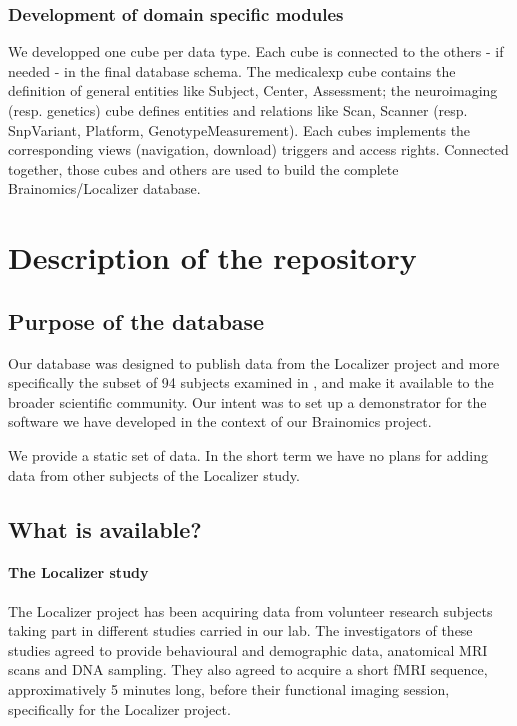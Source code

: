 \documentclass[review]{elsarticle}
\begin{document}
\subsubsection{Development of domain specific modules}

We developped one cube per data type. Each cube is connected to the others - if needed - in the final database schema. The medicalexp cube contains the definition of general entities like Subject, Center, Assessment; the neuroimaging (resp. genetics) cube defines entities and relations like Scan, Scanner (resp. SnpVariant, Platform, GenotypeMeasurement). Each cubes implements the corresponding views (navigation, download) triggers and access rights. Connected together, those cubes and others are used to build the complete Brainomics/Localizer database.


\section{Description of the repository}

\subsection{Purpose of the database}

Our database was designed to publish data from the Localizer project
\cite{Pinel2007} and more specifically the subset of 94 subjects examined
in \cite{Pinel2012}, and make it available to the broader
scientific community. Our intent was to set up a demonstrator for the
software we have developed in the context of our Brainomics project.

We provide a static set of data. In the short term we have no plans for
adding data from other subjects of the Localizer study.


\subsection{What is available?}

\paragraph{The Localizer study} The Localizer project has been acquiring data
from volunteer research subjects taking part in different studies carried
in our lab. The investigators of these studies agreed to provide behavioural
and demographic data, anatomical MRI scans and DNA sampling. They also agreed to
acquire a short fMRI sequence, approximatively 5 minutes long, before their functional
imaging session, specifically for the Localizer project.
\end{document}
